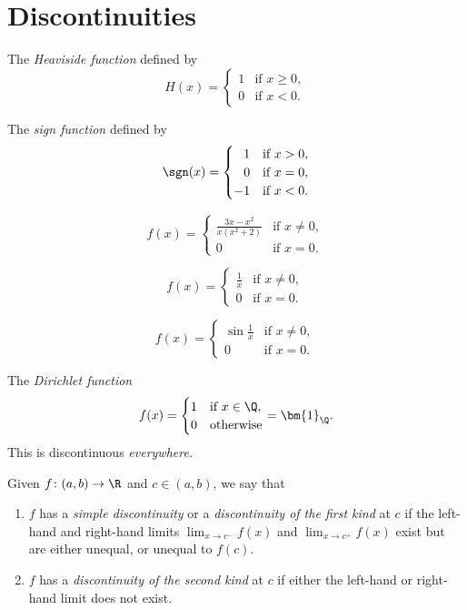 \section{Discontinuities} \label{sec:cont:dis}
\begin{examples}
    \item The \emph{Heaviside function} defined by \[
        H(x) = \begin{cases}
            1 & \text{if } x \ge 0, \\
            0 & \text{if } x < 0.
        \end{cases}
    \]
    \item The \emph{sign function} defined by \[
        \sgn(x) = \begin{cases}
            \hphantom{-}1  & \text{if } x > 0, \\
            \hphantom{-}0  & \text{if } x = 0, \\
            -1 & \text{if } x < 0.
        \end{cases}
    \]
    \item \[
        f(x) = \begin{cases}
            \frac{3x - x^2}{x(x^2 + 2)} & \text{if } x \ne 0, \\
            0 & \text{if } x = 0.
        \end{cases}
    \]
    \item \[
        f(x) = \begin{cases}
            \frac1{x} & \text{if } x \ne 0, \\
            0 & \text{if } x = 0.
        \end{cases}
    \]
    \item \[
        f(x) = \begin{cases}
            \sin\frac1x & \text{if } x \ne 0, \\
            0 & \text{if } x = 0.
        \end{cases}
    \]
    \item The \emph{Dirichlet function} \[
        f(x) = \begin{cases}
            1 & \text{if } x \in \Q, \\
            0 & \text{otherwise}
        \end{cases} = \bm{1}_{\Q}.
    \] This is discontinuous \emph{everywhere}.
\end{examples}

\begin{definition}
    Given $f\colon (a, b) \to \R$ and $c \in (a, b)$, we say that
    \begin{enumerate}
        \item $f$ has a \emph{simple discontinuity} or a \emph{discontinuity
            of the first kind} at $c$ if the left-hand and right-hand limits
            $\lim_{x \to c^-} f(x)$ and $\lim_{x \to c^+} f(x)$ exist but
            are either unequal, or unequal to $f(c)$.
        \item $f$ has a \emph{discontinuity of the second kind} at $c$ if
            either the left-hand or right-hand limit does not exist.
    \end{enumerate}
\end{definition}

